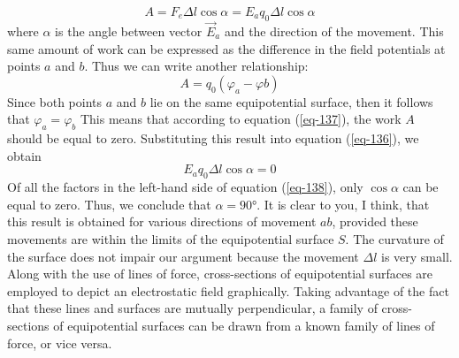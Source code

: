 \documentclass[a4paper,sfsidenotes]{tufte-book}
\begin{document}
\begin{equation}%
A = F_{e}\Delta l \cos \alpha = E_{a} q_{0} \Delta l \cos \alpha
\label{eq-136}
\end{equation}
where $\alpha$ is the angle between vector $\vec{E}_{a}$ and the direction of the movement. This same amount of work can be expressed as the difference in the field potentials at points $a$ and $b$. Thus we can write another relationship:
\begin{equation}%
A=q_{0} \left( \varphi_{a}-\varphi{b} \right)
\label{eq-137}
\end{equation}
Since both points $a$ and $b$ lie on the same equipotential surface, then it follows that $\varphi_{a}=\varphi_{b}$ This means that according to equation (\ref{eq-137}), the work $A$ should be equal to zero. Substituting this result into equation (\ref{eq-136}), we obtain
\begin{equation}%
E_{a}q_{0} \Delta l \cos \alpha=0
\label{eq-138}
\end{equation}
Of all the factors in the left-hand side of equation (\ref{eq-138}), only $\cos \alpha$ can be equal to zero. Thus, we conclude that $\alpha= \ang{90}$. It is clear to you, I think, that this result is obtained for various directions of movement $ab$, provided these movements are within the limits of the equipotential surface $S$. The curvature of the surface does not impair our argument because the movement $\Delta l$ is very small. Along with the use of lines of force, cross-sections of equipotential surfaces are employed to depict an electrostatic field graphically. Taking advantage of the fact that these lines and surfaces are mutually perpendicular, a family of cross-sections of equipotential surfaces can be drawn from a known family of lines of force, or vice versa. 
\end{document}
